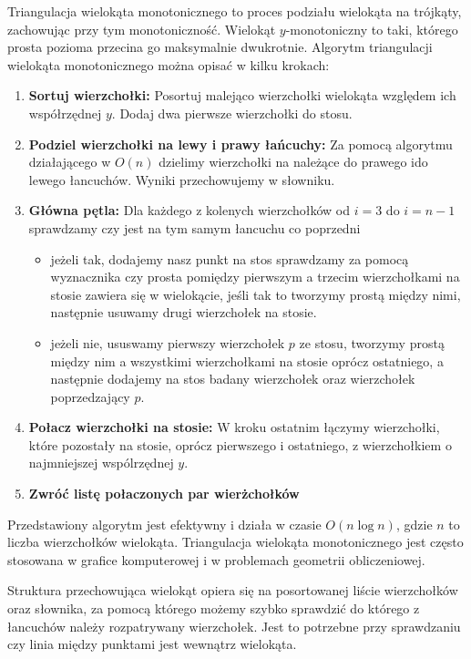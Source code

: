 \quad Triangulacja wielokąta monotonicznego to proces podziału wielokąta na trójkąty, zachowując przy tym monotoniczność. Wielokąt $y$-monotoniczny to taki, którego prosta pozioma przecina go maksymalnie dwukrotnie. Algorytm triangulacji wielokąta monotonicznego można opisać w kilku krokach:

\begin{enumerate}
\item \textbf{Sortuj wierzchołki:} Posortuj malejąco wierzchołki wielokąta względem ich współrzędnej $y$. Dodaj dwa pierwsze wierzchołki do stosu.

\item \textbf{Podziel wierzchołki na lewy i prawy łańcuchy:} Za pomocą algorytmu działającego w $O(n)$ dzielimy wierzchołki na należące do prawego ido lewego łancuchów. 
Wyniki przechowujemy w słowniku.

\item \textbf{Główna pętla:} Dla każdego z kolenych wierzchołków od $i = 3$ do $i = n-1$ sprawdzamy czy jest na tym samym łancuchu co poprzedni

\begin{itemize}
    \item jeżeli tak, 
    dodajemy nasz punkt na stos
    sprawdzamy za pomocą wyznacznika czy prosta pomiędzy pierwszym a trzecim wierzchołkami na stosie zawiera się w wielokącie, jeśli tak to tworzymy prostą między nimi, następnie usuwamy drugi wierzchołek na stosie.
    
    
    \item jeżeli nie, 
    ususwamy pierwszy wierzchołek $p$ ze stosu,
    tworzymy prostą między nim a wszystkimi wierzchołkami na stosie oprócz ostatniego, a następnie dodajemy na stos badany wierzchołek oraz wierzchołek poprzedzający $p$.
\end{itemize}

\item \textbf{Połacz wierzchołki na stosie: } W kroku ostatnim łączymy wierzchołki, które pozostały na stosie, oprócz pierwszego i ostatniego, z wierzchołkiem o najmniejszej wspólrzędnej $y$.
\item \textbf{Zwróć listę połaczonych par wierżchołków}

\end{enumerate}


Przedstawiony algorytm jest efektywny i działa w czasie \(O(n \log n)\), gdzie \(n\) to liczba wierzchołków wielokąta. Triangulacja wielokąta monotonicznego jest często stosowana w grafice komputerowej i w problemach geometrii obliczeniowej.

Struktura przechowująca wielokąt opiera się na posortowanej liście wierzchołków oraz słownika, za pomocą którego możemy szybko sprawdzić do którego z łancuchów należy rozpatrywany wierzchołek. 
Jest to potrzebne przy sprawdzaniu czy linia między punktami jest wewnątrz wielokąta.